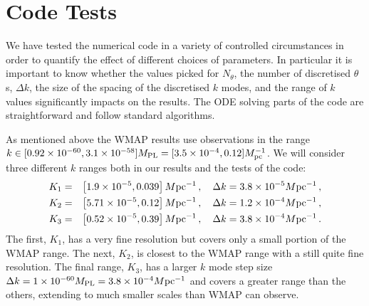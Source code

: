 \section{Code Tests}
\label{sec:tests-num}


We have tested the numerical code in a variety of controlled
circumstances in order to quantify the effect of different choices of
parameters. In particular it is important to know whether the values
picked for $N_\theta$, the number of discretised $\theta$s, $\Delta k$, the size of the
spacing of the discretised $k$ modes, and the range of
$k$ values significantly impacts on the results. The ODE solving parts
of the code are straightforward and follow standard algorithms.


As mentioned above the WMAP results \cite{Komatsu:2008hk} use
observations in the range $k\in [0.92 \times 10^{-60}, 3.1 \times
  10^{-58}]M_{\mathrm{PL}} = [3.5\times 10^{-4}, 0.12] M_{\mathrm{pc}}^{-1}$. We will
consider three different $k$ ranges both in our results and the tests
of the code\footnotemark:
%
\begin{eqnarray}
\label{eq:Krangedefns}
K_1 &=& \left[1.9\times 10^{-5}, 0.039\right]M \mathrm{pc}^{-1}\,,\quad \Delta k = 3.8\times 10^{-5}M \mathrm{pc}^{-1}
\,,\nonumber\\
K_2 &=& \left[5.71\times 10^{-5}, 0.12\right]M \mathrm{pc}^{-1}\,, \quad \Delta k = 1.2\times 10^{-4}M \mathrm{pc}^{-1}\,,
\nonumber\\ 
K_3 &=& \left[0.52\times 10^{-5}, 0.39\right]M \mathrm{pc}^{-1}\,, \quad \Delta k = 3.8\times 10^{-4}M \mathrm{pc}^{-1} \,.
\end{eqnarray}
% 
% 
The first, $K_1$, has a very fine resolution but covers only a small portion of the WMAP range. 
The next, $K_2$, is closest to the WMAP range with a still quite fine resolution.  The final
range, $K_3$, has a larger $k$ mode step size $\Delta k = 1\times 10^{-60}M_{\mathrm{PL}} = 3.8\times 10^{-4}M \mathrm{pc}^{-1}$ and
covers a greater range than the others, extending to much smaller scales than WMAP can observe.

